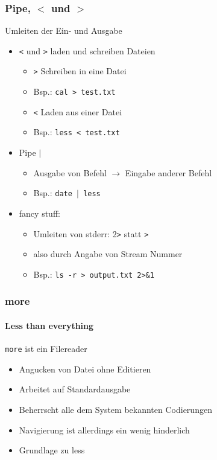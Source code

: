 \documentclass[12pt,utf8, handout]{beamer}
\begin{document}
\begin{frame}
\frametitle{Pipe, $<$ und $>$ }
Umleiten der Ein- und Ausgabe
\begin{itemize}[<+->]
	\item \texttt{<} und \texttt{>} laden und schreiben Dateien
	\begin{itemize}[<+->]
		\item \texttt{>} Schreiben in eine Datei
		\item Bsp.: \texttt{cal > test.txt}
		\item \texttt{<} Laden aus einer Datei
		\item Bsp.: \texttt{less < test.txt}
	\end{itemize}
	\item Pipe \texttt{$\mid$}
	\begin{itemize}[<+->]
		\item Ausgabe von Befehl $\to$ Eingabe anderer Befehl
		\item Bsp.: \texttt{date $\mid$ less}
	\end{itemize}
	\item fancy stuff:
	\begin{itemize}[<+->]
		\item Umleiten von stderr: 2\texttt{>} statt \texttt{>}
		\item also durch Angabe von Stream Nummer
		\item Bsp.: \texttt{ls -r > output.txt 2>\&1 }
	\end{itemize}
\end{itemize}
\end{frame}

\begin{frame}
\frametitle{more}
\framesubtitle{\textcolor{ownDarkOr}{Less than everything}}
\texttt{more} ist ein Filereader
\begin{itemize}
	\item Angucken von Datei ohne Editieren
	\item Arbeitet auf Standardausgabe
	\item Beherrscht alle dem System bekannten Codierungen
	\item Navigierung ist allerdings ein wenig hinderlich
	\item Grundlage zu less
\end{itemize}
\end{frame}
\end{document}
